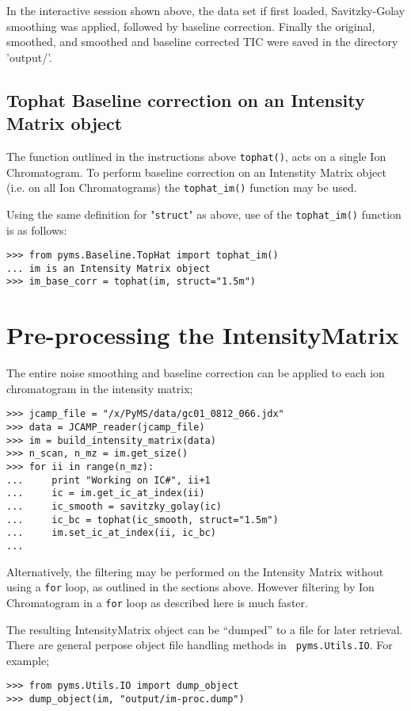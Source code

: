 \noindent
In the interactive session shown above, the data set if first loaded,
Savitzky-Golay smoothing was applied, followed by baseline correction.
Finally the original, smoothed, and smoothed and baseline corrected
TIC were saved in the directory 'output/'.

\subsection{Tophat Baseline correction on an Intensity Matrix object}


The function outlined in the instructions above {\tt tophat()}, acts
on a single Ion Chromatogram. To perform baseline correction on an
Intenstity Matrix object (i.e. on all Ion Chromatograms) the 
{\tt tophat\_im()} function may be used.

Using the same definition for "{\tt struct}" as above, use of the 
{\tt tophat\_im()} function is as follows:

\begin{verbatim}
>>> from pyms.Baseline.TopHat import tophat_im()
... im is an Intensity Matrix object
>>> im_base_corr = tophat(im, struct="1.5m")
\end{verbatim} 


\section{Pre-processing the IntensityMatrix}


The entire noise smoothing and baseline correction can be applied to each ion
chromatogram in the intensity matrix;

\begin{verbatim}
>>> jcamp_file = "/x/PyMS/data/gc01_0812_066.jdx"
>>> data = JCAMP_reader(jcamp_file)
>>> im = build_intensity_matrix(data)
>>> n_scan, n_mz = im.get_size()
>>> for ii in range(n_mz):
...     print "Working on IC#", ii+1
...     ic = im.get_ic_at_index(ii)
...     ic_smooth = savitzky_golay(ic)
...     ic_bc = tophat(ic_smooth, struct="1.5m")
...     im.set_ic_at_index(ii, ic_bc)
...
\end{verbatim}

Alternatively, the filtering may be performed on the Intensity Matrix without
using a {\tt for} loop, as outlined in the sections above. However filtering by 
Ion Chromatogram in a {\tt for} loop as described here is much faster.


The resulting IntensityMatrix object can be ``dumped'' to a file for later
retrieval. There are general perpose object file handling methods in {\tt
pyms.Utils.IO}. For example;

\begin{verbatim}
>>> from pyms.Utils.IO import dump_object
>>> dump_object(im, "output/im-proc.dump")
\end{verbatim}
